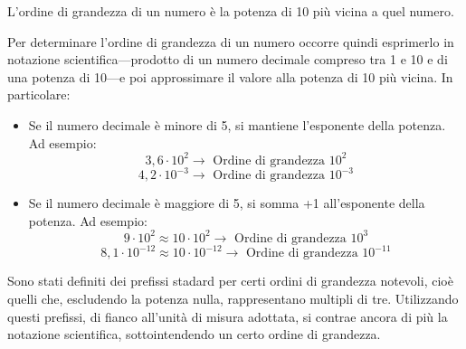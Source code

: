 \begin{tcolorbox}[colback = yellow!30, colframe = yellow!30!black, title = {Ordine di grandezza}]
L'ordine di grandezza di un numero è la potenza di 10 più vicina a quel numero.
\end{tcolorbox}

\noindent Per determinare l'ordine di grandezza di un numero occorre quindi esprimerlo in
notazione scientifica—prodotto di un numero decimale compreso tra 1 e 10 e di
una potenza di 10—e poi approssimare il valore alla potenza di 10 più vicina.
In particolare:
\begin{itemize}
    \item Se il numero decimale è minore di 5, si mantiene l'esponente della
    potenza. Ad esempio:
    \[ 3,6 \cdot 10^2 \to \text{ Ordine di grandezza } 10^2 \]
    \[ 4,2 \cdot 10^{-3} \to \text{ Ordine di grandezza } 10^{-3} \]

    \item Se il numero decimale è maggiore di 5, si somma +1 all'esponente della
    potenza. Ad esempio:
    \[ 9 \cdot 10^2 \approx 10 \cdot 10^2 \to \text{ Ordine di grandezza } 10^3 \]
    \[ 8,1 \cdot 10^{-12} \approx 10 \cdot 10^{-12} \to \text{ Ordine di grandezza } 10^{-11} \]
\end{itemize}

\noindent Sono stati definiti dei prefissi stadard per certi ordini di grandezza notevoli,
cioè quelli che, escludendo la potenza nulla, rappresentano multipli di tre.
Utilizzando questi prefissi, di fianco all'unità di misura adottata, si contrae
ancora di più la notazione scientifica, sottointendendo un certo ordine di
grandezza.